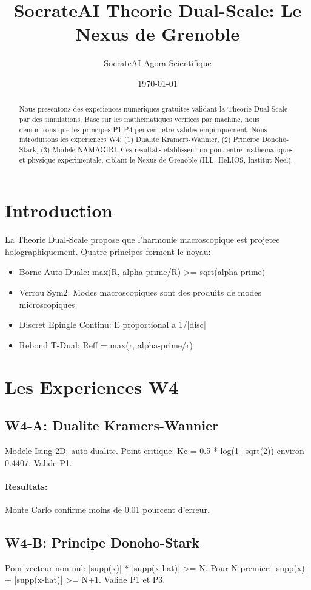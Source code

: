 \documentclass[11pt]{article}
\title{SocrateAI Theorie Dual-Scale: Le Nexus de Grenoble}
\author{SocrateAI Agora Scientifique}
\date{\today}
\begin{document}
\maketitle

\begin{abstract}
Nous presentons des experiences numeriques gratuites validant la Theorie Dual-Scale par des simulations. Base sur les mathematiques verifiees par machine, nous demontrons que les principes P1-P4 peuvent etre valides empiriquement. Nous introduisons les experiences W4: (1) Dualite Kramers-Wannier, (2) Principe Donoho-Stark, (3) Modele NAMAGIRI. Ces resultats etablissent un pont entre mathematiques et physique experimentale, ciblant le Nexus de Grenoble (ILL, HeLIOS, Institut Neel).
\end{abstract}

\section{Introduction}
La Theorie Dual-Scale propose que l'harmonie macroscopique est projetee holographiquement. Quatre principes forment le noyau:
\begin{itemize}
\item[P1] Borne Auto-Duale: max(R, alpha-prime/R) >= sqrt(alpha-prime)
\item[P2] Verrou Sym2: Modes macroscopiques sont des produits de modes microscopiques
\item[P3] Discret Epingle Continu: E proportional a 1/|disc|
\item[P4] Rebond T-Dual: Reff = max(r, alpha-prime/r)
\end{itemize}

\section{Les Experiences W4}
\subsection{W4-A: Dualite Kramers-Wannier}
Modele Ising 2D: auto-dualite. Point critique: Kc = 0.5 * log(1+sqrt(2)) environ 0.4407. Valide P1.
\paragraph{Resultats:} Monte Carlo confirme moins de 0.01 pourcent d'erreur.

\subsection{W4-B: Principe Donoho-Stark}
Pour vecteur non nul: |supp(x)| * |supp(x-hat)| >= N. Pour N premier: |supp(x)| + |supp(x-hat)| >= N+1. Valide P1 et P3.
\end{document}
